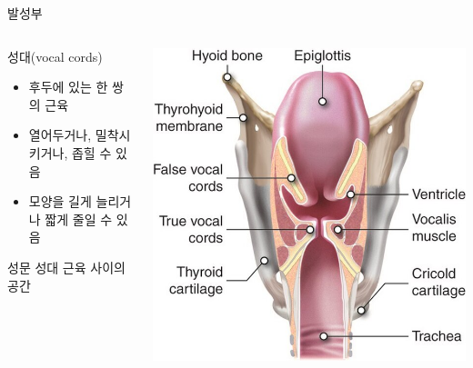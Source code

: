 \documentclass[11pt, aspectratio=169]{beamer}
\begin{document}
\begin{frame}[t]{발성부}
    \begin{columns}
        \begin{column}[T]{0.5\textwidth}
            \begin{block}{성대(vocal cords)}
                \begin{itemize}
                    \item 후두에 있는 한 쌍의 근육
                    \item 열어두거나, 밀착시키거나, 좁힐 수 있음
                    \item 모양을 길게 늘리거나 짧게 줄일 수 있음
                \end{itemize}
            \end{block}
            \begin{block}{성문}
                성대 근육 사이의 공간
            \end{block}
        \end{column}
        \begin{column}[T]{0.43\textwidth}
            \includegraphics[width=1.0\textwidth]{img/Anatomytool_larynx_and_vocal_cords_English.jpg}
        \end{column}
    \end{columns}
\end{frame}
\end{document}
